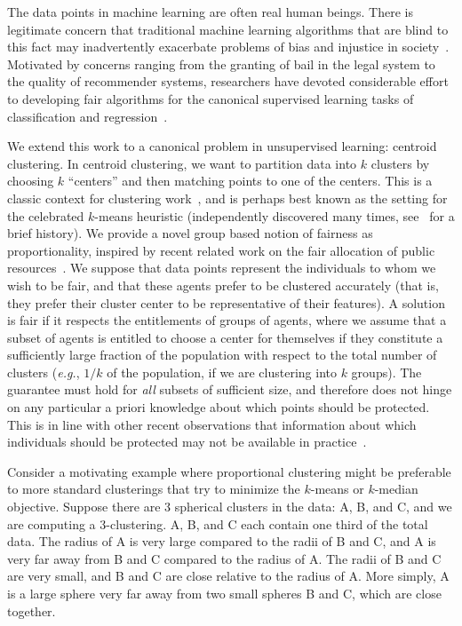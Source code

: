 The data points in machine learning are often real human beings. There is legitimate concern that traditional machine learning algorithms that are blind to this fact may inadvertently exacerbate problems of bias and injustice in society~\cite{propublica}. Motivated by concerns ranging from the granting of bail in the legal system to the quality of recommender systems, researchers have devoted considerable effort to developing fair algorithms for the canonical supervised learning tasks of classification and regression~\cite{awareness, kleinberg2, opportunity, kleinberg1, mistreatment, threshold, calibration, groupEnvyFree, subgroup, convex, fairLossMinimization}. 

We extend this work to a canonical problem in unsupervised learning: centroid clustering. In centroid clustering, we want to partition data into $k$ clusters by choosing $k$ ``centers'' and then matching points to one of the centers. This is a classic context for clustering work~\cite{kcenter, STA97, kMedianLP, kmedians}, and is perhaps best known as the setting for the celebrated $k$-means heuristic (independently discovered many times, see~\cite{clusteringSurvey} for a brief history). We provide a novel group based notion of fairness as proportionality, inspired by recent related work on the fair allocation of public resources~\cite{justifiedRepresentation, fairPublicDecisions, coreEC18, marketsPublicDecisions}. We suppose that data points represent the individuals to whom we wish to be fair, and that these agents prefer to be clustered accurately (that is, they prefer their cluster center to be representative of their features). A solution is fair if it respects the entitlements of groups of agents, where we assume that a subset of agents is entitled to choose a center for themselves if they constitute a sufficiently large fraction of the population with respect to the total number of clusters (\textit{e.g.}, $1/k$ of the population, if we are clustering into $k$ groups). The guarantee must hold for \textit{all} subsets of sufficient size, and therefore does not hinge on any particular a priori knowledge about which points should be protected. This is in line with other recent observations that information about which individuals should be protected may not be available in practice~\cite{fairLossMinimization}.

Consider a motivating example where proportional clustering might be preferable to more standard clusterings that try to minimize the $k$-means or $k$-median objective. Suppose there are 3 spherical clusters in the data: A, B, and C, and we are computing a 3-clustering. A, B, and C each contain one third of the total data. The radius of A is very large compared to the radii of B and C, and A is very far away from B and C compared to the radius of A. The radii of B and C are very small, and B and C are close relative to the radius of A. More simply, A is a large sphere very far away from two small spheres B and C, which are close together.

